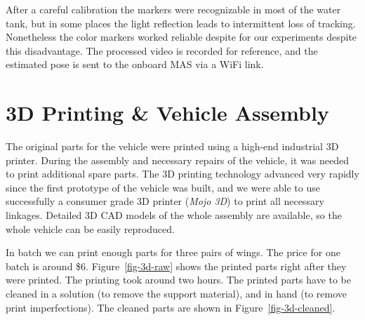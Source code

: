 After a careful calibration the markers were recognizable in most of the water tank, but in some places the light reflection leads to intermittent loss of tracking. Nonetheless the color markers worked reliable despite for our experiments despite this disadvantage. The processed video is recorded for reference, and the estimated pose is sent to the onboard MAS via a WiFi link.



\section{3D Printing \& Vehicle Assembly}
\label{sec-print}
The original parts for the vehicle were printed using a high-end industrial 3D printer. During the assembly and necessary repairs of the vehicle, it was needed to print additional spare parts. The 3D printing technology advanced very rapidly since the first prototype of the vehicle was built, and we were able to use successfully a consumer grade 3D printer (\textit{Mojo 3D}) to print all necessary linkages. Detailed 3D CAD models of the whole assembly are available, so the whole vehicle can be easily reproduced. %

In batch we can print enough parts for three pairs of wings. The price for one batch is around \$6. Figure~\ref{fig-3d-raw} shows the printed parts right after they were printed. The printing took around two hours. The printed parts have to be cleaned in a solution (to remove the support material), and in hand (to remove print imperfections). The cleaned parts are shown in Figure~\ref{fig-3d-cleaned}.

